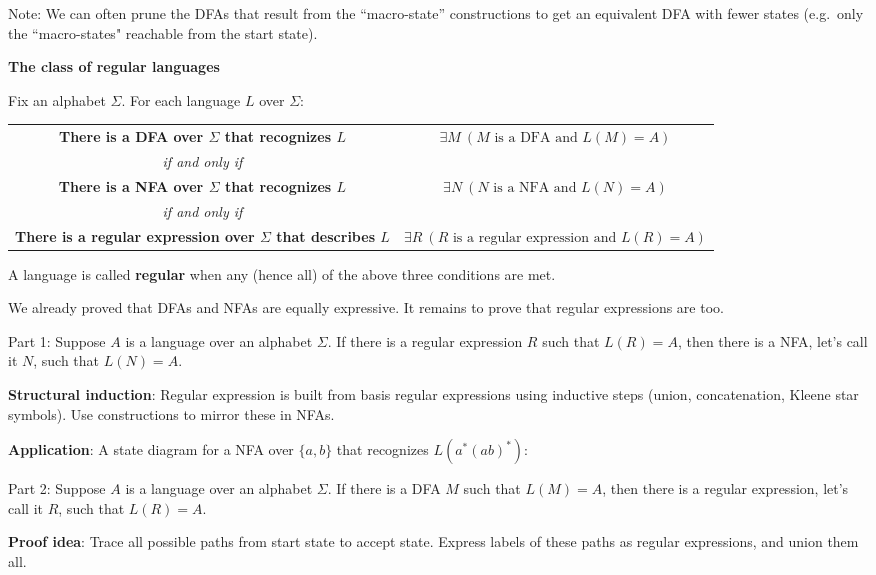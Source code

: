 \documentclass[12pt, oneside]{article}
\begin{document}
\vfill

Note: We can often prune the DFAs that result from the ``macro-state'' constructions to get an 
equivalent DFA with fewer states (e.g.\ only the ``macro-states" reachable from the start state).

\newpage


{\bf The class of regular languages}

Fix an alphabet $\Sigma$. For each language $L$ over $\Sigma$:
\begin{center}
\begin{tabular}{cc}
    {\bf There is a DFA over $\Sigma$ that recognizes $L$}&$\exists M ~(M \textrm{ is a DFA and } L(M) = A)$\\
    {\it if and only if}&\\
    {\bf There is a NFA over $\Sigma$ that recognizes $L$}&$\exists N ~(N \textrm{ is a NFA and } L(N) = A)$\\
    {\it if and only if}&\\
    {\bf There is a regular expression over $\Sigma$ that describes $L$} &$\exists R ~(R \textrm{ is a regular expression and } L(R) = A)$\\
\end{tabular}
\end{center}

A language is called {\bf regular} when any (hence all) of the above three conditions are met.

We already proved that DFAs and NFAs are equally expressive. It remains to prove that regular expressions 
are too.

Part 1: Suppose $A$ is a language over an alphabet $\Sigma$.
If there is a regular expression $R$ such that $L(R) = A$, then there is a NFA, let's call it $N$, such that 
$L(N) = A$.

{\bf Structural induction}: Regular expression is built from basis regular expressions using inductive steps
(union, concatenation, Kleene star symbols). Use constructions to mirror these in NFAs.


{\bf Application}: A state diagram for a NFA over $\{a,b\}$ that recognizes $L(a^* (ab)^*)$:

\vfill

Part 2: Suppose $A$ is a language over an alphabet $\Sigma$.
If there is a DFA $M$ such that $L(M) = A$, then there is a regular expression, let's call it $R$, such that 
$L(R) = A$.

{\bf Proof idea}: Trace all possible paths from start state to accept state.  Express labels of these paths
as regular expressions, and union them all.
\end{document}
